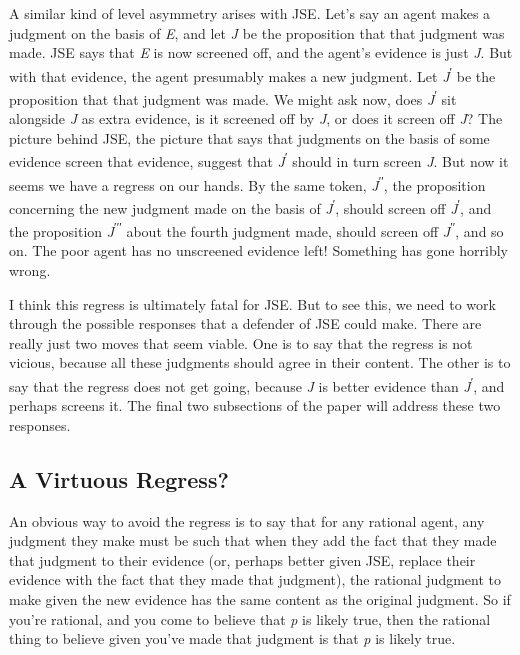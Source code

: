 \documentclass[
  10pt,
  letterpaper,
  DIV=11,
  numbers=noendperiod,
  twoside]{scrartcl}
\begin{document}
A similar kind of level asymmetry arises with JSE. Let's say an agent
makes a judgment on the basis of \emph{E}, and let \emph{J} be the
proposition that that judgment was made. JSE says that \emph{E} is now
screened off, and the agent's evidence is just \emph{J}. But with that
evidence, the agent presumably makes a new judgment. Let
\emph{J}\textsuperscript{ʹ} be the proposition that that judgment was
made. We might ask now, does \emph{J}\textsuperscript{ʹ} sit alongside
\emph{J} as extra evidence, is it screened off by \emph{J}, or does it
screen off \emph{J}? The picture behind JSE, the picture that says that
judgments on the basis of some evidence screen that evidence, suggest
that \emph{J}\textsuperscript{ʹ} should in turn screen \emph{J}. But now
it seems we have a regress on our hands. By the same token,
\emph{J}\textsuperscript{ʹʹ}, the proposition concerning the new
judgment made on the basis of \emph{J}\textsuperscript{ʹ}, should screen
off \emph{J}\textsuperscript{ʹ}, and the proposition
\emph{J}\textsuperscript{ʹʹʹ} about the fourth judgment made, should
screen off \emph{J}\textsuperscript{ʹʹ}, and so on. The poor agent has
no unscreened evidence left! Something has gone horribly wrong.

I think this regress is ultimately fatal for JSE. But to see this, we
need to work through the possible responses that a defender of JSE could
make. There are really just two moves that seem viable. One is to say
that the regress is not vicious, because all these judgments should
agree in their content. The other is to say that the regress does not
get going, because \emph{J} is better evidence than
\emph{J}\textsuperscript{ʹ}, and perhaps screens it. The final two
subsections of the paper will address these two responses.

\subsection{A Virtuous Regress?}\label{a-virtuous-regress}

An obvious way to avoid the regress is to say that for any rational
agent, any judgment they make must be such that when they add the fact
that they made that judgment to their evidence (or, perhaps better given
JSE, replace their evidence with the fact that they made that judgment),
the rational judgment to make given the new evidence has the same
content as the original judgment. So if you're rational, and you come to
believe that \emph{p} is likely true, then the rational thing to believe
given you've made that judgment is that \emph{p} is likely true.
\end{document}
